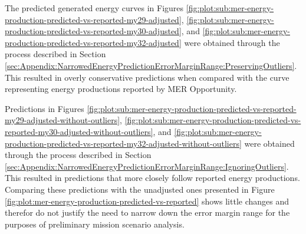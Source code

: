 The predicted generated energy curves in Figures \ref{fig:plot:sub:mer-energy-production-predicted-vs-reported-my29-adjusted}, \ref{fig:plot:sub:mer-energy-production-predicted-vs-reported-my30-adjusted}, and \ref{fig:plot:sub:mer-energy-production-predicted-vs-reported-my32-adjusted} were obtained through the process described in Section \ref{sec:Appendix:NarrowedEnergyPredictionErrorMarginRange:PreservingOutliers}. This resulted in overly conservative predictions when compared with the curve representing energy productions reported by MER Opportunity.

Predictions in Figures \ref{fig:plot:sub:mer-energy-production-predicted-vs-reported-my29-adjusted-without-outliers}, \ref{fig:plot:sub:mer-energy-production-predicted-vs-reported-my30-adjusted-without-outliers}, and \ref{fig:plot:sub:mer-energy-production-predicted-vs-reported-my32-adjusted-without-outliers} were obtained through the process described in Section \ref{sec:Appendix:NarrowedEnergyPredictionErrorMarginRange:IgnoringOutliers}. This resulted in predictions that more closely follow reported energy productions. Comparing these predictions with the unadjusted ones presented in Figure \ref{fig:plot:mer-energy-production-predicted-vs-reported} shows little changes and therefor do not justify the need to narrow down the error margin range for the purposes of preliminary mission scenario analysis.

